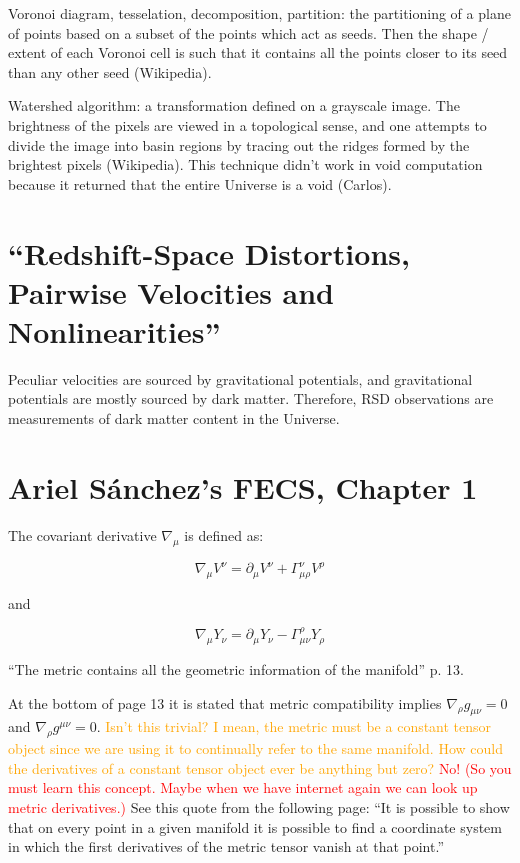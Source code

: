 \documentclass[11pt]{article}
\begin{document}
Voronoi diagram, tesselation, decomposition, partition: the partitioning of a
plane of points based on a subset of the points which act as seeds. Then the
shape / extent of each Voronoi cell is such that it contains all the points
closer to its seed than any other seed (Wikipedia).

Watershed algorithm: a transformation defined on a grayscale image. The
brightness of the pixels are viewed in a topological sense, and one attempts
to divide the image into basin regions by tracing out the ridges formed by
the brightest pixels (Wikipedia). This technique didn't work in void
computation because it returned that the entire Universe is a void (Carlos).

\section{``Redshift-Space Distortions, Pairwise Velocities and
Nonlinearities''}

Peculiar velocities are sourced by gravitational potentials, and gravitational
potentials are mostly sourced by dark matter. Therefore, RSD observations are
measurements of dark matter content in the Universe.

\section{Ariel S\'{a}nchez's FECS, Chapter 1}

The covariant derivative $\nabla_\mu$ is defined as:

\begin{equation}
	\nabla_\mu V^\nu = \partial_\mu V^\nu + \Gamma^\nu_{\mu \rho} V^\rho
\end{equation}

and

\begin{equation}
	\nabla_\mu Y_\nu = \partial_\mu Y_\nu - \Gamma^\rho_{\mu \nu} Y_\rho
\end{equation}

``The metric contains all the geometric information of the manifold'' p. 13.

At the bottom of page 13 it is stated that metric compatibility implies
$\nabla_\rho g_{\mu \nu} = 0$ and $\nabla_\rho  g^{\mu \nu} = 0$.
\textcolor{orange}{Isn't this trivial? I mean, the metric must be a constant
tensor object since we are using it to continually refer to the same manifold.
How could the derivatives of a constant tensor object ever be anything but
zero?} \textcolor{red}{No! (So you must learn this concept. Maybe when we have
internet again we can look up metric derivatives.)} See this quote from the
following page: ``It is possible to show that on every point in a given
manifold it is possible to find a coordinate system in which the first
derivatives of the metric tensor vanish at that point.''
\end{document}
